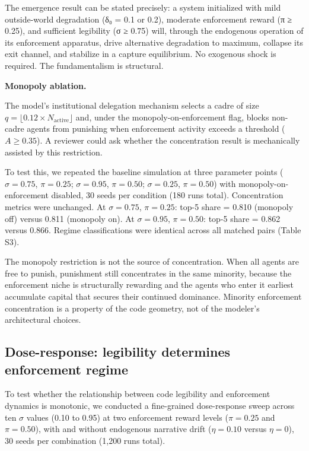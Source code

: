 \documentclass[12pt]{article}
\begin{document}
The emergence result can be stated precisely: a system initialized with mild outside-world degradation (δ₀ = 0.1 or 0.2), moderate enforcement reward (π ≥ 0.25), and sufficient legibility (σ ≥ 0.75) will, through the endogenous operation of its enforcement apparatus, drive alternative degradation to maximum, collapse its exit channel, and stabilize in a capture equilibrium. No exogenous shock is required. The fundamentalism is structural.

%


\textbf{Monopoly ablation.}

The model's institutional delegation mechanism selects a cadre of size
$q = \lfloor 0.12 \times N_{\text{active}} \rfloor$ and, under the
monopoly-on-enforcement flag, blocks non-cadre agents from punishing when
enforcement activity exceeds a threshold ($A \geq 0.35$). A reviewer
could ask whether the concentration result is mechanically assisted by
this restriction.

To test this, we repeated the baseline simulation at three parameter
points ($\sigma = 0.75$, $\pi = 0.25$; $\sigma = 0.95$, $\pi = 0.50$;
$\sigma = 0.25$, $\pi = 0.50$) with monopoly-on-enforcement disabled,
30 seeds per condition (180 runs total). Concentration metrics were
unchanged. At $\sigma = 0.75$, $\pi = 0.25$: top-5 share = 0.810
(monopoly off) versus 0.811 (monopoly on). At $\sigma = 0.95$,
$\pi = 0.50$: top-5 share = 0.862 versus 0.866. Regime classifications
were identical across all matched pairs (Table S3).

The monopoly restriction is not the source of concentration. When all
agents are free to punish, punishment still concentrates in the same
minority, because the enforcement niche is structurally rewarding and the
agents who enter it earliest accumulate capital that secures their
continued dominance. Minority enforcement concentration is a property of
the code geometry, not of the modeler's architectural choices.

\subsection{Dose-response: legibility determines enforcement regime}

To test whether the relationship between code legibility and enforcement
dynamics is monotonic, we conducted a fine-grained dose-response sweep
across ten $\sigma$ values (0.10 to 0.95) at two enforcement reward
levels ($\pi = 0.25$ and $\pi = 0.50$), with and without endogenous
narrative drift ($\eta = 0.10$ versus $\eta = 0$), 30 seeds per
combination (1,200 runs total).
\end{document}
